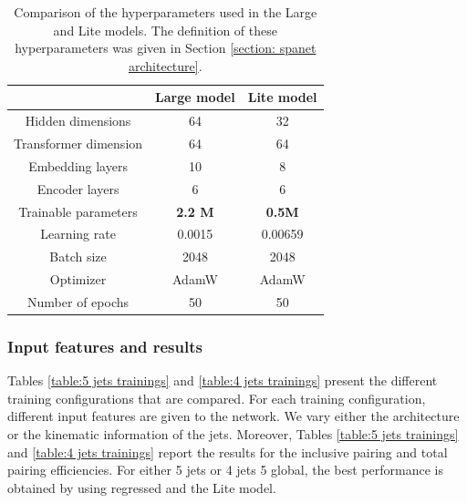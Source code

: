 \begin{table}[h!]
    \centering
     \begin{tabular}{|c||c|c|}
      \hline
         & Large model &  Lite model\\ 
      \hline
      Hidden dimensions & 64 &  32\\ 
      \hline
      Transformer dimension& 64 & 64 \\ 
      \hline
      Embedding layers & 10 & 8 \\ 
      \hline
      Encoder layers & 6 & 6 \\ 
      \hline
      Trainable parameters & \textbf{2.2 M} & \textbf{0.5M} \\ 
      \hline
      Learning rate & 0.0015 & 0.00659 \\ 
      \hline
      Batch size & 2048 & 2048 \\ 
      \hline
      Optimizer & AdamW & AdamW \\ 
      \hline
      Number of epochs & 50 & 50 \\
      \hline
    \end{tabular}
    \caption{Comparison of the hyperparameters used in the Large and Lite models. The definition of these hyperparameters was given in Section \ref{section: spanet architecture}.}
    \label{table:comparison_models}
\end{table}


\subsubsection{Input features and results} \label{subsubsection: input features and results}

Tables \ref{table:5 jets trainings} and \ref{table:4 jets trainings} present the different training configurations that are compared. For each training configuration, different input features are given to the network. We vary either the architecture or the kinematic information of the jets. Moreover, Tables \ref{table:5 jets trainings} and \ref{table:4 jets trainings} report the results for the inclusive pairing and total pairing efficiencies. For either 5 jets or 4 jets 5 global, the best performance is obtained by using \pt regressed and the Lite model. 

